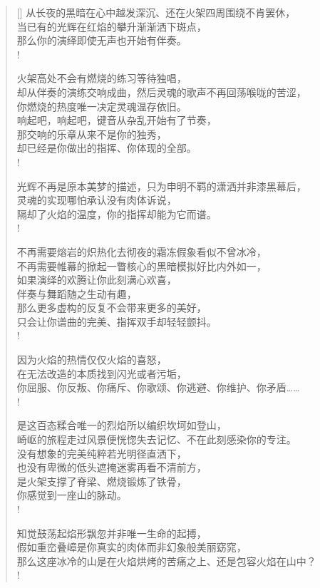 \documentclass[UTF8, 12pt, a4paper]{ctexrep} %
\begin{document}
\begin{verse}[\versewidth]
从长夜的黑暗在心中越发深沉、还在火架四周围绕不肯罢休，\\
当已有的光辉在红焰的攀升渐渐洒下斑点，\\
那么你的演绎即使无声也开始有伴奏。\\!

火架高处不会有燃烧的练习等待独唱，\\
却从伴奏的演练交响成曲，然后灵魂的歌声不再回荡喉咙的苦涩，\\
你燃烧的热度唯一决定灵魂温存依旧。\\
响起吧，响起吧，键音从杂乱开始有了节奏，\\
那交响的乐章从来不是你的独秀，\\
却已经是你做出的指挥、你体现的全部。\\!

光辉不再是原本美梦的描述，只为申明不羁的潇洒并非漆黑幕后，\\
灵魂的实现哪怕承认没有肉体诉说，\\
隔却了火焰的温度，你的指挥却能为它而谱。\\!

不再需要熔岩的炽热化去彻夜的霜冻假象看似不曾冰冷，\\
不再需要帷幕的掀起一瞥核心的黑暗模拟好比内外如一，\\
如果演绎的欢腾让你此刻满心欢喜，\\
伴奏与舞蹈随之生动有趣，\\
那么更多虚构的反复不会带来更多的美好，\\
只会让你谱曲的完美、指挥双手却轻轻颤抖。\\!

因为火焰的热情仅仅火焰的喜怒，\\
在无法改造的本质找到闪光或者污垢，\\
你屈服、你反叛、你痛斥、你歌颂、你逃避、你维护、你矛盾……\\!

是这百态糅合唯一的烈焰所以编织坎坷如登山，\\
崎岖的旅程走过风景便恍惚失去记忆、不在此刻感染你的专注。\\
没有想象的完美纯粹若光明径直洒下，\\
也没有卑微的低头遮掩迷雾再看不清前方，\\
是火架支撑了脊梁、燃烧锻炼了铁骨，\\
你感觉到一座山的脉动。\\!

知觉鼓荡起焰形飘忽并非唯一生命的起搏，\\
假如重峦叠嶂是你真实的肉体而非幻象般美丽窈窕，\\
那么这座冰冷的山是在火焰烘烤的苦痛之上、还是包容火焰在山中？\\!


\end{verse}
\end{document}
